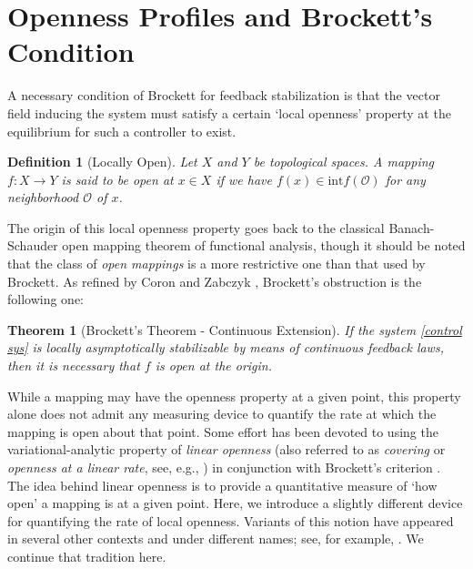 \documentclass[pdflatex,sn-mathphys-num]{sn-jnl}%
\theoremstyle{thmstyleone}%
\newtheorem{theorem}{Theorem}%
\theoremstyle{thmstyletwo}%
\theoremstyle{thmstylethree}%
\newtheorem{definition}{Definition}%
\begin{document}

\section{Openness Profiles and Brockett's Condition}

    
    A necessary condition of Brockett \cite{brockett} for feedback stabilization is that the vector field inducing the system must satisfy a certain `local openness' property at the equilibrium for such a controller to exist.
    
    \begin{definition}[Locally Open]\label{open}
        Let $X$ and $Y$ be topological spaces.  A mapping $f \colon X\rightarrow Y$ is said to be \emph{open at  $x\in X$} if we have $f(x) \in \textrm{int}f(\mathcal{O})$ for any neighborhood $\mathcal{O}$ of $x$.
    \end{definition}
    
    The origin of this local openness property goes back to the classical Banach-Schauder open mapping theorem of functional analysis, though it should be noted that the class of \textit{open mappings} is a more restrictive one than that used by Brockett.  As refined by Coron \cite{coron2} and Zabczyk \cite{zab}, Brockett's obstruction is the following one: 
    
    
     \begin{theorem}[Brockett's Theorem - Continuous Extension] \label{brocketts - continuous extension} 
        If the system \eqref{control sys} is locally asymptotically stabilizable by means of continuous feedback laws, then it is necessary that $f$ is open at the origin.
    \end{theorem}
    
    
    While a mapping may have the openness property at a given point, this property alone does not admit any measuring device to quantify the rate at which the mapping  is open about that point. Some effort has been devoted to using the variational-analytic property of \textit{linear openness} (also referred to as {\it covering} or {\it openness at a linear rate}, see, e.g., \cite{mordukhovich3,rockafellar}) in conjunction with Brockett's criterion \cite{christopherson2022continuous,christopherson2019}.  The idea behind linear openness is to provide a quantitative measure of `how open' a mapping is at a given point.  Here, we introduce a slightly different device for quantifying the rate of local openness.  Variants of this notion have appeared in several other contexts  and under different names; see, for example,  \cite{ioffe2013nonlinear,borwein1988verifiable}.  We continue that tradition here. 
\end{document}
